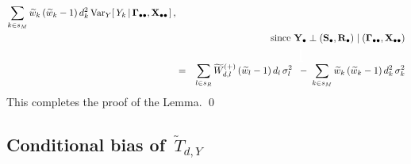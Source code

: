 \begin{enumerate}
\begin{eqnarray*}
{            \underset{k \in s_{M}}{\sum}\,
            \widetilde{w}_{k}\,(\widetilde{w}_{k}-1)\,d_{k}^{2}\,\Var_{Y}\!\left[\,
                Y_{k}
                \left\vert\,
                \Gdotdot,\Xobs
                \right.
                \right],
        }
    \\
    &&
        \quad\quad\quad
        \textnormal{since $\Ydot \perp (\Sdot,\Rdot) \;\vert\; (\Gdotdot,\Xobs)$}
    \\
    & = &
        \overset{{\color{white}\textnormal{\huge$1$}}}{
            \underset{l \in s_{R}}{\sum}\,
            \widetilde{W}^{(+)}_{d,l}\,(\widetilde{w}_{l}-1)\,d_{l}\,\sigma_{l}^{2}
            \;\;-\;
            \underset{k \in s_{M}}{\sum}\,
            \widetilde{w}_{k}\,(\widetilde{w}_{k}-1)\,d_{k}^{2}\,\sigma_{k}^{2}
        }
    \end{eqnarray*}
    \vskip 0.1cm
    \noindent
    This completes the proof of the Lemma.
    \qed
\end{enumerate}


\clearpage
\subsection{Conditional bias of \,$\widetilde{T}_{d,Y}$}
\setcounter{theorem}{0}


